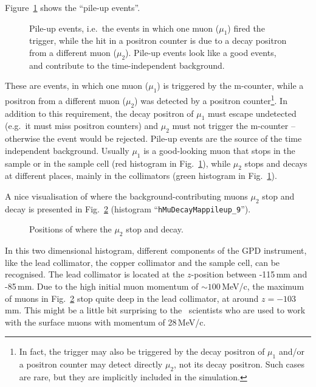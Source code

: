 \documentclass[twoside]{dis04}
\begin{document}
Figure~\ref{humanDecayHistograms_9} shows the ``pile-up events''.
%
\begin{figure}[htbp]\centering
\epsfig{file=pict/Plot201_2_new.eps,width=0.9\linewidth,%
clip=}
\caption{Pile-up events, i.e.\ the events in which one muon ($\mu_1$) fired the
trigger, while the hit in a positron counter is due to a decay positron from 
a different muon ($\mu_2$).  Pile-up events look like a good events, and contribute
to the time-independent background.}
\label{humanDecayHistograms_9}
\end{figure}
%
These are events, in which one muon ($\mu_1$) is triggered by the m-counter, 
while a positron from a different muon ($\mu_2$) was detected by 
a positron counter\footnote{In fact, the trigger may also be triggered by
the decay positron of $\mu_1$ and/or a positron counter may detect
directly $\mu_2$, not its decay positron. Such cases are rare, but they 
are implicitly included in the simulation.}.
In addition to this requirement, the decay positron of $\mu_1$ must
escape undetected (e.g.\ it must miss positron counters) and $\mu_2$ must not trigger the m-counter
-- otherwise the event would be rejected.
Pile-up events are the source of the time independent background.
Usually $\mu_1$ is a good-looking muon that stops in the sample or in the sample cell
(red histogram in Fig.~\ref{humanDecayHistograms_9}), while $\mu_2$ stops and decays at different places,
mainly in the collimators (green histogram in Fig.~\ref{humanDecayHistograms_9}).

A nice visualisation of where the background-contributing muons $\mu_2$ stop and decay
is presented in Fig.~\ref{Pileup_muon_decay_map} (histogram ``{\tt hMuDecayMappileup\_9}'').
%
\begin{figure}[htbp]\centering
\epsfig{file=pict/Pileup_muon_decay_map.eps,width=0.7\linewidth,%
clip=}
\caption{Positions of where the $\mu_2$ stop and decay.}
\label{Pileup_muon_decay_map}
\end{figure}
%
In this two dimensional histogram, different components of the GPD instrument, 
like the lead collimator, the copper collimator and the sample cell, can be recognised.
The lead collimator is located at the $z$-position between -115\,mm and -85\,mm.
Due to the high initial muon momentum of $\sim 100\,$MeV/c,
the maximum of muons in Fig.~\ref{Pileup_muon_decay_map} stop quite deep in the
lead collimator, at around $z=-103$\,mm.  This might be a little bit surprising to the
\musr\ scientists who are used to work with the surface muons with momentum of 28\,MeV/c.
\end{document}
